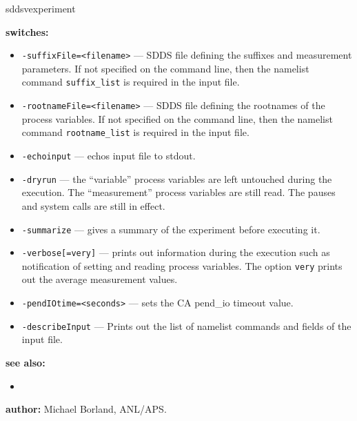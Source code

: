 \begin{sddsprog}{sddsvexperiment}
\item \textbf{switches:}
\begin{itemize}
  \item {\verb+-suffixFile=<filename>+} --- SDDS file defining the suffixes and measurement parameters. If not specified
               on the command line, then the namelist command {\verb+suffix_list+} is required in the input file.
  \item {\verb+-rootnameFile=<filename>+} --- SDDS file defining the rootnames of the process variables. If not specified
               on the command line, then the namelist command {\verb+rootname_list+} is required in the input file.
  \item {\verb+-echoinput+} --- echos input file to stdout.
  \item {\verb+-dryrun+} --- the ``variable'' process variables are left untouched during the execution. The ``measurement''
                process variables are still read. The pauses and system calls are still in effect.
  \item {\verb+-summarize+} --- gives a summary of the experiment before executing it.
  \item {\verb+-verbose[=very]+} --- prints out information during the execution such as notification of
                setting and reading process variables.  The option \verb+very+ prints out the average measurement values.
  \item {\verb+-pendIOtime=<seconds>+} --- sets the CA pend\_io timeout value.
  \item {\verb+-describeInput+} --- Prints out the list of namelist commands and fields of the input file.
\end{itemize}

\item \textbf{see also:}
\begin{itemize}
  \item {}
\end{itemize}
\item \textbf{author:} Michael Borland, ANL/APS.
\end{sddsprog}
